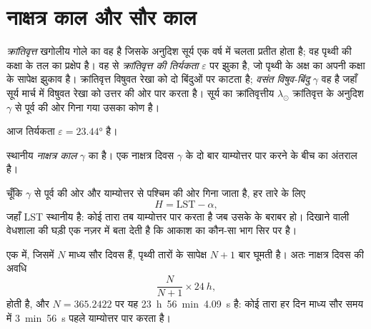 \section{नाक्षत्र काल और सौर काल}

\begin{definition}[क्रांतिवृत्त]\label{def:b1:spherical-astronomy:ecliptic}
\emph{क्रांतिवृत्त} खगोलीय गोले का वह  है जिसके अनुदिश सूर्य एक वर्ष में
चलता प्रतीत होता है; वह पृथ्वी की कक्षा के तल का प्रक्षेप है। वह  से
\emph{क्रांतिवृत्त की तिर्यकता} $\varepsilon$ पर झुका है, जो पृथ्वी
के अक्ष का अपनी कक्षा के सापेक्ष झुकाव है। क्रांतिवृत्त विषुवत रेखा को दो बिंदुओं पर काटता है;
\emph{वसंत विषुव-बिंदु} $\gamma$ वह है जहाँ सूर्य मार्च में विषुवत रेखा को
उत्तर की ओर पार करता है। सूर्य का क्रांतिवृत्तीय  $\lambda_\odot$ क्रांतिवृत्त के अनुदिश
$\gamma$ से पूर्व की ओर गिना गया उसका कोण है।
\end{definition}

आज तिर्यकता $\varepsilon = \ang{23.44}$ है।

\begin{definition}[नाक्षत्र काल]\label{def:b1:spherical-astronomy:sidereal-time}
स्थानीय \emph{नाक्षत्र काल}  $\gamma$ का  है। एक
नाक्षत्र दिवस $\gamma$ के दो बार याम्योत्तर पार करने के बीच का अंतराल है।
\end{definition}

चूँकि  $\gamma$ से पूर्व की ओर और  याम्योत्तर से पश्चिम की ओर गिना जाता है,
हर तारे के लिए
\[
  H = \mathrm{LST} - \alpha ,
\]
जहाँ LST स्थानीय  है: कोई तारा तब याम्योत्तर पार करता है जब  उसके
 के बराबर हो।  दिखाने वाली वेधशाला की घड़ी एक नज़र में बता देती है कि
आकाश का कौन-सा भाग सिर पर है।

\begin{proposition}[नाक्षत्र और सौर दिवस]\label{prop:b1:spherical-astronomy:sidereal-day}
एक  में, जिसमें $N$ माध्य सौर दिवस हैं, पृथ्वी तारों के सापेक्ष $N + 1$ बार
घूमती है। अतः नाक्षत्र दिवस की अवधि
\[
  \frac{N}{N + 1}\times\qty{24}{h},
\]
होती है, और $N = 365.2422$ पर यह \qty{23}{h}~\qty{56}{min}~\qty{4.09}{s} है: कोई तारा हर दिन
माध्य सौर समय में \qty{3}{min}~\qty{56}{s} पहले याम्योत्तर पार करता है।
\end{proposition}

